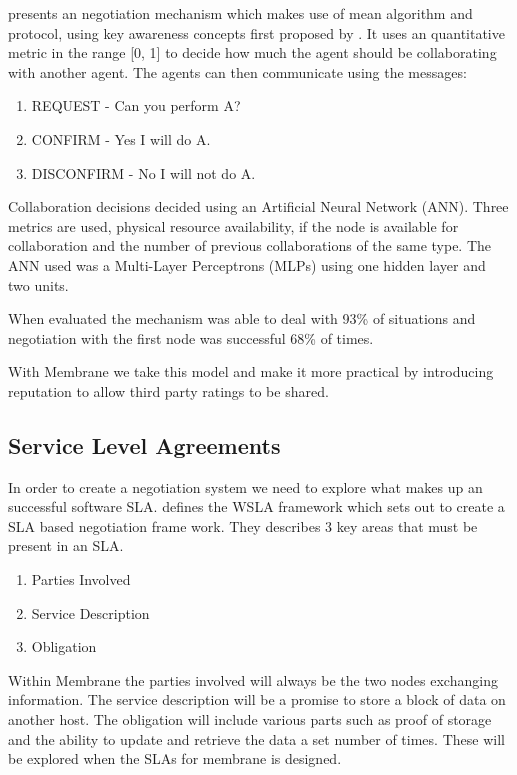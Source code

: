 \documentclass[a4paper, 11pt, twocolumn, twoside]{report}
\begin{document}
\cite{paletta2009mas} presents an negotiation mechanism which makes use of mean algorithm and protocol, using key awareness concepts first proposed by \cite{herrero2007agents}. It uses an quantitative metric in the range [0, 1] to decide how much the agent should be collaborating with another agent. The agents can then communicate using the messages:

\begin{enumerate}
 \item REQUEST - Can you perform A?
 \item CONFIRM - Yes I will do A.
 \item DISCONFIRM - No I will not do A.
\end{enumerate}

Collaboration decisions decided using an Artificial Neural Network (ANN). Three metrics are used, physical resource availability, if the node is available for collaboration and the number of previous collaborations of the same type. The ANN used was a Multi-Layer Perceptrons (MLPs) using one hidden layer and two units.

When evaluated the mechanism was able to deal with 93\% of situations and negotiation with the first node was successful 68\% of times. \citep{herrero2007agents}

With Membrane we take this model and make it more practical by introducing reputation to allow third party ratings to be shared.

\subsection{Service Level Agreements}

In order to create a negotiation system we need to explore what makes up an successful software SLA. \cite{keller2002defining} defines the WSLA framework which sets out to create a SLA based negotiation frame work.
They describes 3 key areas that must be present in an SLA.
\begin{enumerate}
 \item Parties Involved
 \item Service Description
 \item Obligation
\end{enumerate}
Within Membrane the parties involved will always be the two nodes exchanging information. The service description will be a promise to store a block of data on another host. The obligation will include various parts such as proof of storage and the ability to update and retrieve the data a set number of times. These will be explored when the SLAs for membrane is designed.
\end{document}
